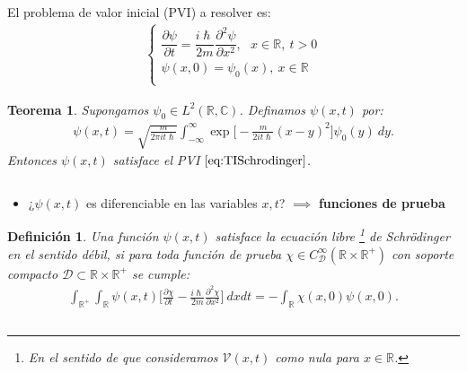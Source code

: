 \documentclass[aspectratio=1610]{beamer}
\newcommand*{\field}[1]{\mathbb{#1}}
\newtheorem*{teo}{Teorema}
\newtheorem*{defn}{Definición}
\begin{document}
\begin{frame}

El problema de valor inicial (PVI) a resolver es:
    \begin{align}
         \left\{ \begin{array}{ll}
         \dfrac{\partial\psi}{\partial t} = \dfrac{i\hslash}{2m}\dfrac{\partial^2\psi}{\partial x^2},\:\:\:x\in\field{R},\:t>0 \\
         \psi(x,0) = \psi_{0}(x),\:x\in\field{R} \\
         \end{array}
\right.
    \label{eq:TISchrodinger}
    \end{align}
 
\vspace{0.02\textheight} 
    
\begin{teo}
    Supongamos $\psi_{0} \in L^2(\field{R},\field{C})$. Definamos $\psi(x,t)$ por:
    \begin{align*}
        \psi(x,t) = \sqrt{\frac{m}{2\pi it\hslash}}\int_{-\infty}^{\infty}\exp\bigg[-\frac{m}{2it\hslash}(x-y)^2\bigg]\psi_{0}(y) \: dy.
    \end{align*}
    Entonces $\psi(x,t)$ satisface el PVI $\eqref{eq:TISchrodinger}$.
    \label{teo:Rev4}
\end{teo}

\begin{columns}
\column{37em}
\end{columns}
\end{frame}
\begin{frame}{}

\begin{itemize}\itemsep1em
  \justifying
  \item  \textcolor{Ocean}{¿$\psi(x,t)$ es diferenciable en las variables $x,t$? $\implies$ \textbf{funciones de prueba}} 
\end{itemize}

\vspace{0.1\textheight} 

\begin{defn}
        Una función $\psi(x,t)$ satisface la ecuación libre \footnote{En el sentido de que consideramos $\mathcal{V}(x,t)$ como nula para $x\in\field{R}$.}  de Schrödinger en el sentido débil, si para toda función de prueba $\chi \in C_{\mathcal{D}}^{\infty}(\field{R}\times\field{R}^{+})$ con soporte compacto $\mathcal{D}\subset \field{R}\times\field{R}^{+}$ se cumple:
        \begin{align} \int_{\field{R}^+}\int_{\field{R}}\psi(x,t)\bigg[\frac{\partial\chi}{\partial t}-\frac{i\hslash}{2m}\frac{\partial ^2\chi}{\partial x^2}\bigg]\:dxdt = -\int_{\field{R}}\chi(x,0)\psi(x,0). \label{eq:Soldebil}
        \end{align}
        \label{lem:Rev5}
\end{defn}
    
\begin{columns}
\column{37em}
\end{columns}
\end{frame}
\end{document}
